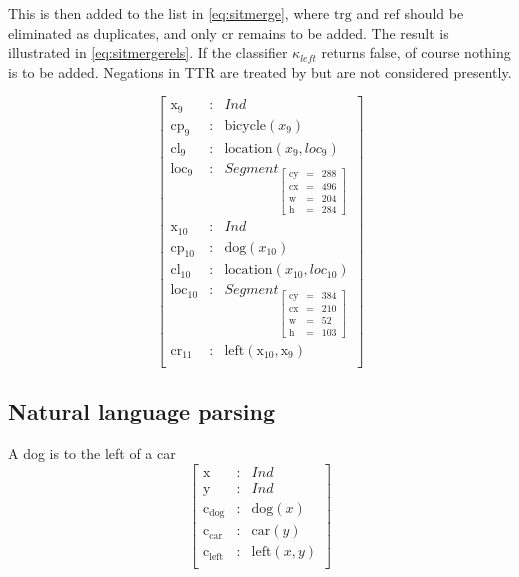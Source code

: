 \documentclass[11pt, a4paper]{article}
\begin{document}
This is then added to the list in \autoref{eq:sitmerge}, where $\text{trg}$ and $\text{ref}$ should be eliminated as duplicates, and only $\text{cr}$ remains to be added.
The result is illustrated in \ref{eq:sitmergerels}.
If the classifier $\kappa_{left}$ returns false, of course nothing is to be added.
Negations in TTR are treated by \cite{CooperNegationdialogue2018} but are not considered presently.

\begin{equation}\label{eq:sitmergerels}
\left[\begin{array}{rcl}
\text{x}_\text{9} &:& Ind\\
\text{cp}_\text{9} &:& \text{bicycle}(x_{9})\\
\text{cl}_\text{9} &:& \text{location}(x_{9}, loc_{9})\\
\text{loc}_\text{9} &:& Segment_{\left[\begin{array}{rcl}
	\text{cy} &=& 288\\
	\text{cx} &=& 496\\
	\text{w} &=& 204\\
	\text{h} &=& 284
	\end{array}\right]}\\
\text{x}_\text{10} &:& Ind\\
\text{cp}_\text{10} &:& \text{dog}(x_{10})\\
\text{cl}_\text{10} &:& \text{location}(x_{10}, loc_{10})\\
\text{loc}_\text{10} &:& Segment_{\left[\begin{array}{rcl}
	\text{cy} &=& 384\\
	\text{cx} &=& 210\\
	\text{w} &=& 52\\
	\text{h} &=& 103
	\end{array}\right]}\\
\text{cr}_\text{11} &:& \text{left}(\text{x}_{10}, \text{x}_9)\\
\end{array}\right]\end{equation}


\subsection{Natural language parsing}

A dog is to the left of a car
\begin{equation}\left[\begin{array}{rcl}
\text{x} &:& Ind\\
\text{y} &:& Ind\\
\text{c}_\text{dog} &:& \text{dog}(x)\\
\text{c}_\text{car} &:& \text{car}(y)\\
\text{c}_\text{left} &:& \text{left}(x, y)\\
\end{array}\right]\end{equation}
\end{document}
